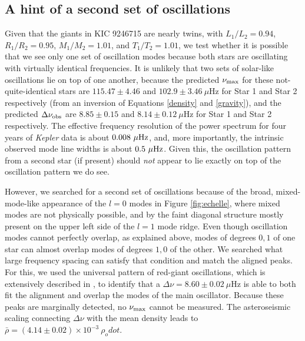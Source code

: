 \subsection{A hint of a second set of oscillations}\label{search}
\label{subsubsec_second_osc}

Given that the giants in KIC 9246715 are nearly twins, with $L_1/L_2 = 0.94$, $R_1/R_2 = 0.95$, $M_1/M_2 = 1.01$, and $T_1/T_2 = 1.01$, we test whether it is possible that we see only one set of oscillation modes because both stars are oscillating with virtually identical frequencies. It is unlikely that two sets of solar-like oscillations lie on top of one another, because the predicted $\nu_{\rm{max}}$ for these not-quite-identical stars are $115.47 \pm 4.46$ and $102.9 \pm 3.46\ \mu$Hz for Star 1 and Star 2 respectively (from an inversion of Equations \ref{density} and \ref{gravity}), and the predicted $\Delta\nu_{\rm{obs}}$ are $8.85 \pm 0.15$ and $8.14 \pm 0.12 \ \mu$Hz for Star 1 and Star 2 respectively. The effective frequency resolution of the power spectrum for four years of \emph{Kepler} data is about $0.008 \ \mu \rm{Hz}$, and, more importantly, the intrinsic observed mode line widths is about $0.5 \ \mu \rm{Hz}$. Given this, the oscillation pattern from a second star (if present) should \emph{not} appear to lie exactly on top of the oscillation pattern we do see.

However, we searched for a second set of oscillations because of the broad, mixed-mode-like appearance of the $l=0$ modes in Figure \ref{fig:echelle}, where mixed modes are not physically possible, and by the faint diagonal structure mostly present on the upper left side of the $l=1$ mode ridge. Even though oscillation modes cannot perfectly overlap, as explained above, modes of degrees $0,1$ of one star can almost overlap modes of degrees $1,0$ of the other. We searched what large frequency spacing can satisfy that condition and match the aligned peaks. For this, we used the universal pattern of red-giant oscillations, which is extensively described in \citet{mos11}, to identify that a $\Delta\nu = 8.60\pm0.02\ \mu$Hz is able to both fit the alignment and overlap the modes of the main oscillator. Because these peaks are marginally detected, no $\nu_{\rm{max}}$ cannot be measured. The asteroseismic scaling connecting $\Delta\nu$ with the mean density leads to $\bar{\rho} = (4.14 \pm 0.02)\times 10^{-3}\ \rho_odot$.


